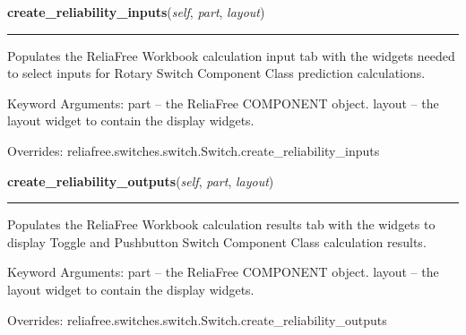     \vspace{0.5ex}

\hspace{.8\funcindent}\begin{boxedminipage}{\funcwidth}

    \raggedright \textbf{create\_reliability\_inputs}(\textit{self}, \textit{part}, \textit{layout})

    \vspace{-1.5ex}

    \rule{\textwidth}{0.5\fboxrule}
\setlength{\parskip}{2ex}
    Populates the ReliaFree Workbook calculation input tab with the widgets
    needed to select inputs for Rotary Switch Component Class prediction 
    calculations.

    Keyword Arguments: part   -- the ReliaFree COMPONENT object. layout -- 
    the layout widget to contain the display widgets.

\setlength{\parskip}{1ex}
      Overrides: reliafree.switches.switch.Switch.create\_reliability\_inputs

    \end{boxedminipage}

    \vspace{0.5ex}

\hspace{.8\funcindent}\begin{boxedminipage}{\funcwidth}

    \raggedright \textbf{create\_reliability\_outputs}(\textit{self}, \textit{part}, \textit{layout})

    \vspace{-1.5ex}

    \rule{\textwidth}{0.5\fboxrule}
\setlength{\parskip}{2ex}
    Populates the ReliaFree Workbook calculation results tab with the 
    widgets to display Toggle and Pushbutton Switch Component Class 
    calculation results.

    Keyword Arguments: part   -- the ReliaFree COMPONENT object. layout -- 
    the layout widget to contain the display widgets.

\setlength{\parskip}{1ex}
      Overrides: reliafree.switches.switch.Switch.create\_reliability\_outputs

    \end{boxedminipage}

    \vspace{0.5ex}

